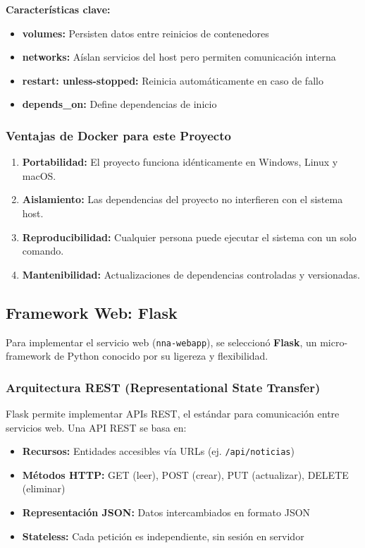 \textbf{Características clave:}
\begin{itemize}
    \item \textbf{volumes:} Persisten datos entre reinicios de contenedores
    \item \textbf{networks:} Aíslan servicios del host pero permiten comunicación interna
    \item \textbf{restart: unless-stopped:} Reinicia automáticamente en caso de fallo
    \item \textbf{depends\_on:} Define dependencias de inicio
\end{itemize}

\subsubsection{Ventajas de Docker para este Proyecto}
\label{subsubsec:ventajas_docker}

\begin{enumerate}
    \item \textbf{Portabilidad:} El proyecto funciona idénticamente en Windows, Linux y macOS.
    \item \textbf{Aislamiento:} Las dependencias del proyecto no interfieren con el sistema host.
    \item \textbf{Reproducibilidad:} Cualquier persona puede ejecutar el sistema con un solo comando.
    \item \textbf{Mantenibilidad:} Actualizaciones de dependencias controladas y versionadas.
\end{enumerate}

\subsection{Framework Web: Flask}
\label{subsec:flask}

Para implementar el servicio web (\texttt{nna-webapp}), se seleccionó \textbf{Flask}, un micro-framework de Python conocido por su ligereza y flexibilidad.

\subsubsection{Arquitectura REST (Representational State Transfer)}
\label{subsubsec:rest}

Flask permite implementar APIs REST, el estándar para comunicación entre servicios web. Una API REST se basa en:

\begin{itemize}
    \item \textbf{Recursos:} Entidades accesibles vía URLs (ej. \texttt{/api/noticias})
    \item \textbf{Métodos HTTP:} GET (leer), POST (crear), PUT (actualizar), DELETE (eliminar)
    \item \textbf{Representación JSON:} Datos intercambiados en formato JSON
    \item \textbf{Stateless:} Cada petición es independiente, sin sesión en servidor
\end{itemize}

